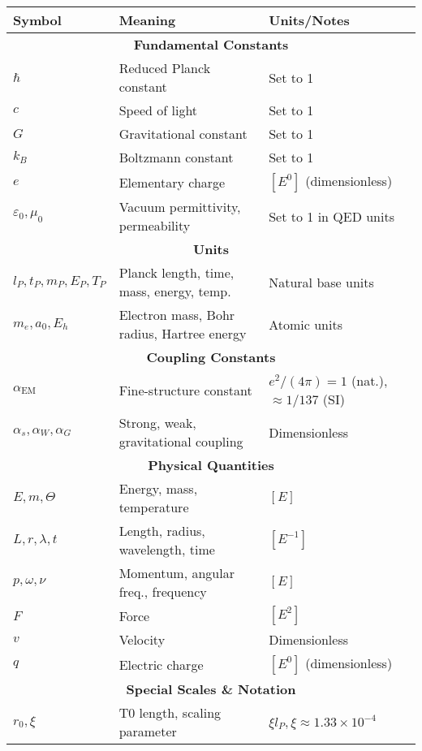 \documentclass[11pt,a4paper]{article}
\begin{document}
	{\small
		\begin{table}[htbp]
			\centering
			\begin{adjustbox}{width=0.98\textwidth}
				\begin{tabular}{lll}
					\toprule
					\textbf{Symbol} & \textbf{Meaning} & \textbf{Units/Notes} \\
					\midrule
					\multicolumn{3}{c}{\textbf{Fundamental Constants}} \\
					$\hbar$ & Reduced Planck constant & Set to 1 \\
					$c$ & Speed of light & Set to 1 \\
					$G$ & Gravitational constant & Set to 1 \\
					$k_B$ & Boltzmann constant & Set to 1 \\
					$e$ & Elementary charge & $[E^0]$ (dimensionless) \\
					$\varepsilon_0, \mu_0$ & Vacuum permittivity, permeability & Set to 1 in QED units \\
					\midrule
					\multicolumn{3}{c}{\textbf{Units}} \\
					$l_P, t_P, m_P, E_P, T_P$ & Planck length, time, mass, energy, temp. & Natural base units \\
					$m_e, a_0, E_h$ & Electron mass, Bohr radius, Hartree energy & Atomic units \\
					\midrule
					\multicolumn{3}{c}{\textbf{Coupling Constants}} \\
					$\alpha_{\text{EM}}$ & Fine-structure constant & $e^2/(4\pi) = 1$ (nat.), $\approx 1/137$ (SI) \\
					$\alpha_s, \alpha_W, \alpha_G$ & Strong, weak, gravitational coupling & Dimensionless \\
					\midrule
					\multicolumn{3}{c}{\textbf{Physical Quantities}} \\
					$E, m, \Theta$ & Energy, mass, temperature & $[E]$ \\
					$L, r, \lambda, t$ & Length, radius, wavelength, time & $[E^{-1}]$ \\
					$p, \omega, \nu$ & Momentum, angular freq., frequency & $[E]$ \\
					$F$ & Force & $[E^2]$ \\
					$v$ & Velocity & Dimensionless \\
					$q$ & Electric charge & $[E^0]$ (dimensionless) \\
					\midrule
					\multicolumn{3}{c}{\textbf{Special Scales \& Notation}} \\
					$r_0, \xi$ & T0 length, scaling parameter & $\xi l_P, \xi \approx 1.33 \times 10^{-4}$ \\

\end{tabular}
\end{adjustbox}
\end{table}}
\end{document}
